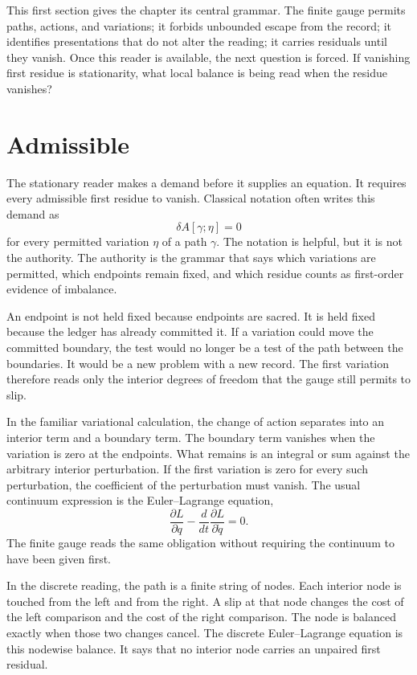This first section gives the chapter its central grammar. The finite gauge
permits paths, actions, and variations; it forbids unbounded escape from
the record; it identifies presentations that do not alter the reading; it
carries residuals until they vanish. Once this reader is available, the
next question is forced. If vanishing first residue is stationarity, what
local balance is being read when the residue vanishes?

\section{Admissible}

The stationary reader makes a demand before it supplies an equation. It
requires every admissible first residue to vanish. Classical notation often
writes this demand as
\[
  \delta A[\gamma;\eta] = 0
\]
for every permitted variation \(\eta\) of a path \(\gamma\). The notation is
helpful, but it is not the authority. The authority is the grammar that says
which variations are permitted, which endpoints remain fixed, and which
residue counts as first-order evidence of imbalance.

An endpoint is not held fixed because endpoints are sacred. It is held fixed
because the ledger has already committed it. If a variation could move the
committed boundary, the test would no longer be a test of the path between
the boundaries. It would be a new problem with a new record. The first
variation therefore reads only the interior degrees of freedom that the
gauge still permits to slip.

In the familiar variational calculation, the change of action separates
into an interior term and a boundary term. The boundary term vanishes when
the variation is zero at the endpoints. What remains is an integral or sum
against the arbitrary interior perturbation. If the first variation is zero
for every such perturbation, the coefficient of the perturbation must
vanish. The usual continuum expression is the Euler--Lagrange equation,
\[
  \frac{\partial L}{\partial q}
  - \frac{d}{dt}\frac{\partial L}{\partial \dot q} = 0 .
\]
The finite gauge reads the same obligation without requiring the continuum
to have been given first.

In the discrete reading, the path is a finite string of nodes. Each interior
node is touched from the left and from the right. A slip at that node changes
the cost of the left comparison and the cost of the right comparison. The
node is balanced exactly when those two changes cancel. The discrete
Euler--Lagrange equation is this nodewise balance. It says that no interior
node carries an unpaired first residual.


